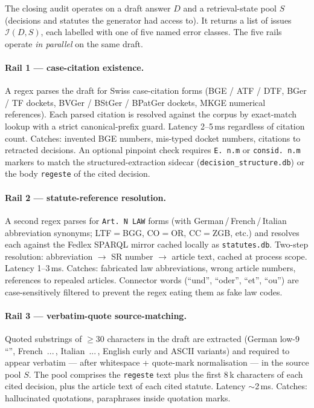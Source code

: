
The closing audit operates on a draft answer $D$ and a retrieval-state pool $S$ (decisions and statutes the generator had access to). It returns a list of issues $\mathcal{I}(D, S)$, each labelled with one of five named error classes. The five rails operate \emph{in parallel} on the same draft.

\paragraph{Rail 1 --- case-citation existence.}
A regex parses the draft for Swiss case-citation forms (BGE / ATF / DTF, BGer / TF dockets, BVGer / BStGer / BPatGer dockets, MKGE numerical references). Each parsed citation is resolved against the corpus by exact-match lookup with a strict canonical-prefix guard. Latency 2--5\,ms regardless of citation count. Catches: invented BGE numbers, mis-typed docket numbers, citations to retracted decisions. An optional pinpoint check requires \texttt{E.\,n.m} or \texttt{consid.\,n.m} markers to match the structured-extraction sidecar (\texttt{decision\_structure.db}) or the body \texttt{regeste} of the cited decision.

\paragraph{Rail 2 --- statute-reference resolution.}
A second regex parses for \texttt{Art.\,N\,LAW} forms (with German\,/\,French\,/\,Italian abbreviation synonyms; LTF$=$BGG, CO$=$OR, CC$=$ZGB, etc.) and resolves each against the Fedlex SPARQL mirror cached locally as \texttt{statutes.db}. Two-step resolution: abbreviation $\rightarrow$ SR number $\rightarrow$ article text, cached at process scope. Latency 1--3\,ms. Catches: fabricated law abbreviations, wrong article numbers, references to repealed articles. Connector words (``und'', ``oder'', ``et'', ``ou'') are case-sensitively filtered to prevent the regex eating them as fake law codes.

\paragraph{Rail 3 --- verbatim-quote source-matching.}
Quoted substrings of $\geq 30$ characters in the draft are extracted (German low-9 \textquotedblleft\textquotedblright, French \guillemotleft\,...\,\guillemotright, Italian \guillemotleft\,...\,\guillemotright, English curly and ASCII variants) and required to appear verbatim --- after whitespace + quote-mark normalisation --- in the source pool $S$. The pool comprises the \texttt{regeste} text plus the first 8\,k characters of each cited decision, plus the article text of each cited statute. Latency $\sim$2\,ms. Catches: hallucinated quotations, paraphrases inside quotation marks.

